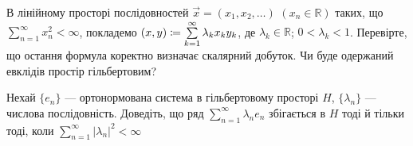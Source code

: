 \begin{exercise}
    В лінійному просторі послідовностей $\vec{x} = (x_1, x_2, \dots)$
    $(x_n \in \mathbb{R})$ таких, що $\sum\limits^\infty_{n=1} x_n^2 < \infty$,
    покладемо $\left(x, y\right) \coloneqq \sum\limits^\infty_{k=1} \lambda_k x_k y_k$,
    де $\lambda_k \in \mathbb{R}$; $0 < \lambda_k < 1$. Перевірте, що остання формула
    коректно визначає скалярний добуток. Чи буде одержаний евклідів простір гільбертовим?
\end{exercise}

\begin{exercise}
    Нехай $\{e_n\}$ --- ортонормована система в гільбертовому просторі $H$,
    $\{\lambda_n\}$ --- числова послідовність. Доведіть, що ряд $\sum\limits^\infty_{n=1}
    \lambda_n e_n$ збігається в $H$ тоді й тільки тоді, коли $\sum\limits^\infty_{n=1}
    |\lambda_n|^2 < \infty$
\end{exercise}
